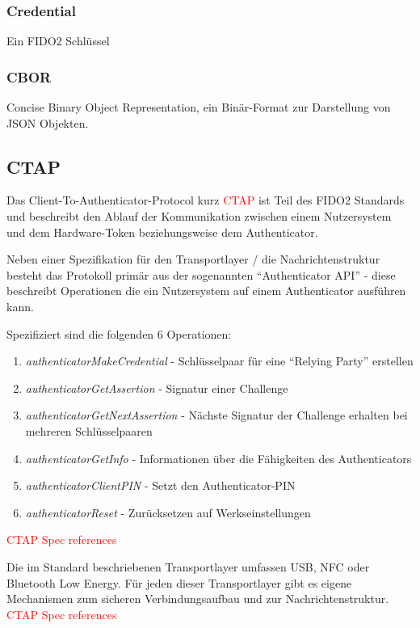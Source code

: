 \documentclass[journal]{IEEEtran}
\begin{document}
\subsubsection{Credential}

Ein FIDO2 Schlüssel

\subsubsection{CBOR}

Concise Binary Object Representation, ein Binär-Format zur Darstellung von JSON Objekten.

\subsection{CTAP}

Das Client-To-Authenticator-Protocol kurz \textcolor{red}{CTAP} ist Teil
des FIDO2 Standards und beschreibt den Ablauf der Kommunikation zwischen einem
Nutzersystem und dem Hardware-Token beziehungsweise dem Authenticator.

Neben einer Spezifikation für den Transportlayer / die Nachrichtenstruktur
besteht das Protokoll primär aus der sogenannten ``Authenticator API'' - diese
beschreibt Operationen die ein Nutzersystem auf einem Authenticator ausführen kann.

Spezifiziert sind die folgenden 6 Operationen:

\begin{enumerate}
	\item \textit{authenticatorMakeCredential} - Schlüsselpaar für eine
		``Relying Party'' erstellen
	\item \textit{authenticatorGetAssertion} - Signatur einer Challenge
	\item \textit{authenticatorGetNextAssertion} - Nächste Signatur der
		Challenge erhalten bei mehreren Schlüsselpaaren
	\item \textit{authenticatorGetInfo} - Informationen über die Fähigkeiten
		des Authenticators
	\item \textit{authenticatorClientPIN} - Setzt den Authenticator-PIN
	\item \textit{authenticatorReset} - Zurücksetzen auf Werkseinstellungen
\end{enumerate}

\textcolor{red}{CTAP Spec references}

Die im Standard beschriebenen Transportlayer umfassen USB, NFC oder Bluetooth
Low Energy. Für jeden dieser Transportlayer gibt es eigene Mechanismen zum
sicheren Verbindungsaufbau und zur Nachrichtenstruktur.
\textcolor{red}{CTAP Spec references}
\end{document}
